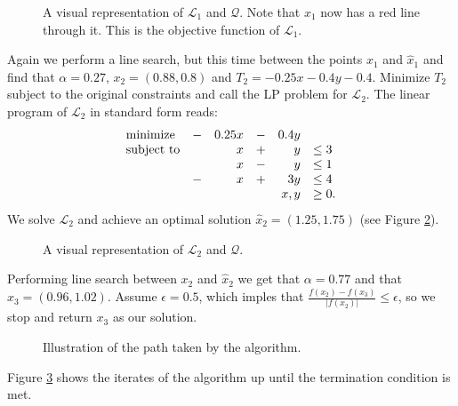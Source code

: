 \begin{figure}[ht!]
\centering

\caption{A visual representation of $\mathcal{L}_1$ and $\mathcal{Q}$.
         Note that $x_1$ now has a red line through it. This is
         the objective function of $\mathcal{L}_1$.}
\label{fig:lp2}
\end{figure}

Again we perform a line search, but this time between the points $x_1$ and
$\hat{x}_1$ and find that $\alpha = 0.27$, $x_2 = (0.88, 0.8)$ and
$T_2 = -0.25x -0.4y -0.4$.
Minimize $T_2$ subject to the original constraints and call the LP problem for
$\mathcal{L}_2$.
The linear program of $\mathcal{L}_2$ in standard form reads:
\[
\begin{array}{lcrcrl}
    \textrm{minimize}   &-& 0.25 x &-& 0.4 y & \\
    \textrm{subject to} & &      x &+&     y & \leq 3 \\
                        & &      x &-&     y & \leq 1 \\
                        &-&      x &+&   3 y & \leq 4 \\
      \multicolumn{5}{r}{x,y}                & \geq 0.
\end{array}
\]
We solve $\mathcal{L}_2$ and achieve an optimal solution $\hat{x}_2
= (1.25, 1.75)$ (see Figure \ref{fig:lp3}).
\begin{figure}[ht!]
\centering

\caption{A visual representation of $\mathcal{L}_2$ and $\mathcal{Q}$.}
\label{fig:lp3}
\end{figure}

Performing line search between $x_2$ and $\hat{x}_2$ we get that
$\alpha = 0.77$ and that $x_3 = (0.96, 1.02)$.
Assume $\epsilon = 0.5$, which imples that
$\frac{f(x_2) - f(x_3)}{|f(x_2)|} \leq \epsilon$, so we stop and return $x_3$
as our solution.

\begin{figure}[ht!]
\centering

\caption{Illustration of the path taken by the algorithm.}
\label{fig:slppath}
\end{figure}

Figure \ref{fig:slppath} shows the iterates of the algorithm up until
the termination condition is met.
